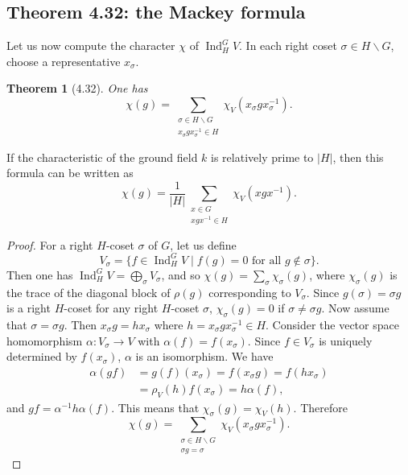 \documentclass[UTF8,11pt,a4paper]{ctexart}
\newtheorem*{theorem}{Theorem}
\theoremstyle{definition}\newtheorem*{definition}{Definition}
\theoremstyle{remark}\newtheorem*{remark}{Remark}
\DeclareMathOperator{\Ind}{Ind}
\begin{document}
\subsection*{Theorem 4.32: the Mackey formula}
Let us now compute the character $\chi$ of $\Ind_H^G V$. In each right coset $\sigma\in H\backslash G$, choose a representative $x_\sigma$.
\begin{theorem}[4.32]
One has
\[
\chi(g)=\sum_{\substack{\sigma\in H\backslash G\\x_\sigma gx_\sigma^{-1}\in H}}
\chi_V(x_\sigma gx_\sigma^{-1}).
\]
\end{theorem}
If the characteristic of the ground field $k$ is relatively prime to $|H|$, then this formula can be written as
\[
\chi(g)=\frac1{|H|}\sum_{\substack{x\in G\\xgx^{-1}\in H}}\chi_V(xgx^{-1}).
\]
\begin{proof}
For a right $H$-coset $\sigma$ of $G$, let us define
\[
V_\sigma=\{f\in\Ind_H^G V\mid f(g)=0\text{ for all }g\notin\sigma\}.
\]
Then one has $\Ind_H^G V=\bigoplus_\sigma V_\sigma$, and so
$\chi(g)=\sum_\sigma\chi_\sigma(g)$, where $\chi_\sigma(g)$ is the trace of the diagonal block of $\rho(g)$ corresponding to $V_\sigma$.
Since $g(\sigma)=\sigma g$ is a right $H$-coset for any right $H$-coset $\sigma$, $\chi_\sigma(g)=0$ if $\sigma\ne\sigma g$.
Now assume that $\sigma=\sigma g$. Then $x_\sigma g=hx_\sigma$ where $h=x_\sigma gx_\sigma^{-1}\in H$.
Consider the vector space homomorphism $\alpha:V_\sigma\to V$ with $\alpha(f)=f(x_\sigma)$. Since $f\in V_\sigma$ is uniquely determined by $f(x_\sigma)$, $\alpha$ is an isomorphism. We have
\begin{align*}
\alpha(gf)&=g(f)(x_\sigma)=f(x_\sigma g)=f(hx_\sigma)\\
&=\rho_V(h)f(x_\sigma)=h\alpha(f),
\end{align*}
and $gf=\alpha^{-1}h\alpha(f)$. This means that $\chi_\sigma(g)=\chi_V(h)$. Therefore
\[
\chi(g)=\sum_{\substack{\sigma\in H\backslash G\\\sigma g=\sigma}}\chi_V(x_\sigma gx_\sigma^{-1}).
\]
\end{proof}
\end{document}
